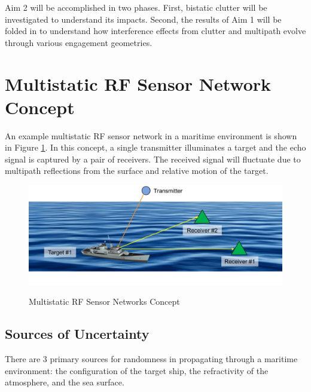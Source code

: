 Aim 2 will be accomplished in two phases. First, bistatic clutter will be investigated to understand its impacts. Second, the results of Aim 1 will be folded in to understand how interference effects from clutter and multipath evolve through various engagement geometries.

\section{Multistatic RF Sensor Network Concept}
An example multistatic RF sensor network in a maritime environment is shown in Figure \ref{ms_fig:1}. In this concept, a single transmitter illuminates a target and the echo signal is captured by a pair of receivers. The received signal will fluctuate due to multipath reflections from the surface and relative motion of the target.

\begin{figure}[H]
  \begin{center}
\includegraphics[width=5in]{../media/multistatic/ms_rf_concept.png}
  \end{center}
  \renewcommand{\baselinestretch}{1} \small\normalsize
  \begin{quote}
    \caption[Multistatic RF Sensor Networks Concept]{Multistatic RF Sensor Networks Concept\label{ms_fig:1}}
  \end{quote}
\end{figure}
\renewcommand{\baselinestretch}{2} \small\normalsize

\subsection{Sources of Uncertainty}
There are 3 primary sources for randomness in propagating through a maritime environment: the configuration of the target ship, the refractivity of the atmosphere, and the sea surface.

